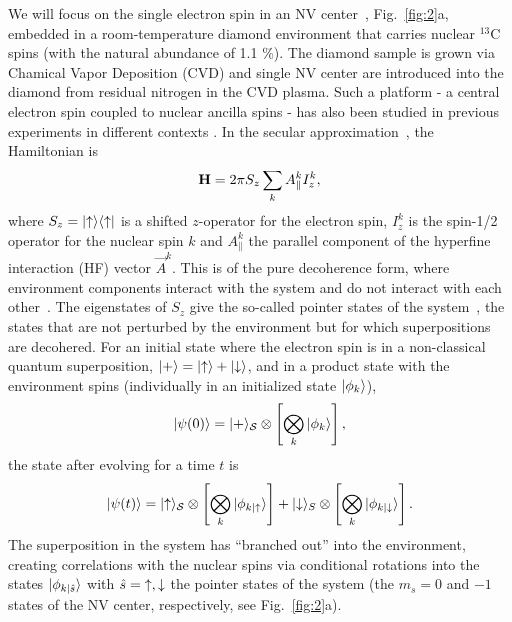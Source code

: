 \documentclass[aps,prl,floatfix,twocolumn,footinbib,superscriptaddress]{revtex4-1}
\begin{document}
We will focus on the single electron spin in an NV center~\cite{DOHERTY20131,PSSA:PSSA200671403}, Fig.~\ref{fig:2}a, embedded in a room-temperature diamond environment that carries nuclear $^{13}$C spins (with the natural abundance of 1.1 \%). The diamond sample is grown via Chamical Vapor Deposition (CVD) and single NV center are introduced into the diamond from residual nitrogen in the CVD plasma. Such a platform - a central electron spin coupled to nuclear ancilla spins - has also been studied in previous experiments in different contexts \cite{Taminiau14,Hirose16,Zaiser16}. In the secular approximation~\cite{Childress281}, the Hamiltonian is 
\begin{equation}
\mathbf{H} = 2\pi S_z\sum_k A^k_\parallel I^k_z ,
\label{eq:H0}
\end{equation}
where $S_z = |\mathord{\uparrow}\rangle\langle\mathord{\uparrow}|$ is a shifted $z$-operator for the electron spin, $I^k_z$ is the spin-1/2 operator for the nuclear spin $k$ and $A^k_\parallel$ the parallel component of the hyperfine interaction (HF) vector $\vec{A}^k$. This is of the pure decoherence form, where environment components interact with the system and do not interact with each other~\cite{Zwolak14,zwolak16,Riedel12-1}. The eigenstates of $S_z$ give the so-called pointer states of the system~\cite{Zurek81-1}, the states that are not perturbed by the environment but for which superpositions are decohered. For an initial state where the electron spin is in a non-classical quantum superposition, $|+\rangle=|\mathord{\uparrow}\rangle+|\mathord{\downarrow}\rangle$, and in a product state with the environment spins (individually in an initialized state $|\phi_k\rangle$), 
\begin{equation}
|\psi(0)\rangle = |+\rangle_{\mathcal{S}} \otimes \left[ \bigotimes_k |\phi_k\rangle \right],
\label{eq:Psi0}
\end{equation}
the state after evolving for a time $t$ is
\begin{equation}
|\psi(t)\rangle = |\mathord{\uparrow}\rangle_{\mathcal{S}} \otimes \left[ \bigotimes_k |\phi_{k|\mathord{\uparrow}}\rangle \right] + |\mathord{\downarrow}\rangle_S \otimes \left[ \bigotimes_k |\phi_{k|\mathord{\downarrow}}\rangle \right].
\label{eq:GHZ}
\end{equation}
The superposition in the system has ``branched out'' into the environment, creating correlations with the nuclear spins via conditional rotations into the states $|\phi_{k|\hat{s}}\rangle$ with $\hat{s}=\mathord{\uparrow},\mathord{\downarrow}$ the pointer states of the system (the $m_s =0$ and $-1$ states of the NV center, respectively, see Fig.~\ref{fig:2}a). 
\end{document}

